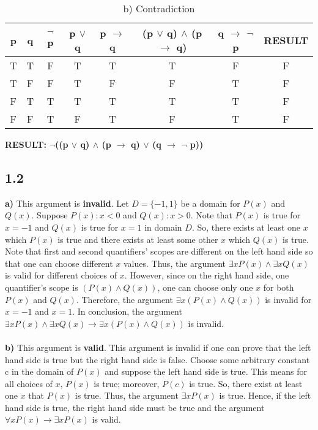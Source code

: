\documentclass[12pt]{article}
\begin{document}
\begin{table}[H]
\small
\centering
\caption{ b) Contradiction }
\label{table:example}
\begin{tabular}
{|c|c|c|c|c|c|c|c|}	%
\hline 							%
\textbf{p} & \textbf{q} & \textbf{$\neg$ p} & \textbf{p $\vee$ q} & \textbf{p $\rightarrow$ q} & \textbf{(p $\vee$ q) $\wedge$ (p $\rightarrow$ q)} & \textbf{q $\rightarrow$ $\neg$ p} & \textbf{RESULT}\\
\hline 
T & T & F & T & T & T & F & F \\			%
T & F & F & T & F & F & T & F \\
F & T & T & T & T & T & T & F \\
F & F & T & F & T & F & T & F \\
\hline 

\end{tabular}
\end{table}
\textbf{RESULT:} \textbf{$\neg$((p $\vee$ q) $\wedge$ (p $\rightarrow$ q) $\vee$ (\textbf{q $\rightarrow$ $\neg$ p}))}

\subsection*{1.2}
\textbf{a)} This argument is \textbf{invalid}. Let $D=\{-1,1\}$ be a domain for $P(x)$ and $Q(x)$. Suppose $P(x) : x<0 $ and $Q(x) : x>0 $. Note that $P(x)$ is true for $x=-1$ and $Q(x)$ is true for $x=1$ in domain $D$. So, there exists at least one $x$ which $P(x)$ is true and there exists at least some other $x$ which $Q(x)$ is true. Note that first and second quantifiers' scopes are different on the left hand side so that one can choose different $x$ values. Thus, the argument $\exists x P(x) \wedge \exists x Q(x)$ is valid for different choices of $x$. However, since on the right hand side, one quantifier's scope is $(P(x) \wedge Q(x))$, one can choose only one $x$ for both $P(x)$ and $Q(x)$. Therefore, the argument $\exists x (P(x) \wedge Q(x))$ is invalid for $x=-1$ and $x=1$. In conclusion, the argument $\exists x P(x) \wedge \exists x Q(x) \rightarrow \exists x (P(x) \wedge Q(x))$ is invalid.\\\\
\textbf{b)} This argument is \textbf{valid}. This argument is invalid if one can prove that the left hand side is true but the right hand side is false. Choose some arbitrary constant c in the domain of $P(x)$ and suppose the left hand side is true. This means for all choices of $x$, $P(x)$ is true; moreover, $P(c)$ is true. So, there exist at least one $x$ that $P(x)$ is true. Thus, the argument $\exists x P(x)$ is true. Hence, if the left hand side is true, the right hand side must be true and the argument $\forall x P(x) \rightarrow \exists x P(x)$ is valid.
\end{document}
